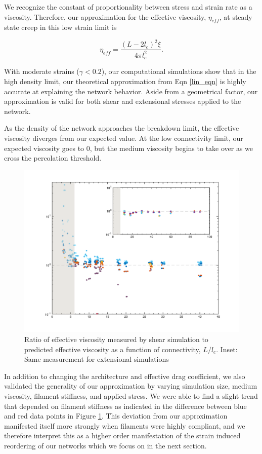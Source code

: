 \documentclass[pre,reprint]{revtex4-1}
\begin{document}
We recognize the constant of proportionality between stress and strain rate as a viscosity.  Therefore, our approximation for the effective viscosity, $\eta_{eff}$, at steady state creep in this low strain limit is

\begin{equation}
\label{lin_eqn}
\eta_{eff} = \frac{(L-2l_c)^2 \xi}{4\pi l_c^2} .
\end{equation}

With moderate strains ($\gamma<0.2$), our computational simulations show that in the high density limit, our theoretical approximation from Eqn \ref{lin_eqn} is highly accurate at explaining the network behavior.  Aside from a geometrical factor, our approximation is valid for both shear and extensional stresses applied to the network.

As the density of the network approaches the breakdown limit, the effective viscosity diverges from our expected value.  At the low connectivity limit, our expected viscosity goes to 0, but the medium viscosity begins to take over as we cross the percolation threshold.  
\begin{figure}[h!]
\centering
\includegraphics[width=\hsize]{eff_vic_master}
\caption{\label{fig:effvic}Ratio of effective viscosity measured by shear simulation to predicted effective viscosity as a function of connectivity, $L/l_c$. Inset: Same measurement for extensional simulations }
\end{figure}

In addition to changing the architecture and effective drag coefficient, we also validated the generality of our approximation by varying simulation size, medium viscosity, filament stiffness, and applied stress.  We were able to find a slight trend that depended on filament stiffness as indicated in the difference between blue and red data points in Figure \ref{fig:effvic}.  This deviation from our approximation manifested itself more strongly when filaments were highly compliant, and we therefore interpret this as a higher order manifestation of the strain induced reordering of our networks which we focus on in the next section.
\end{document}
